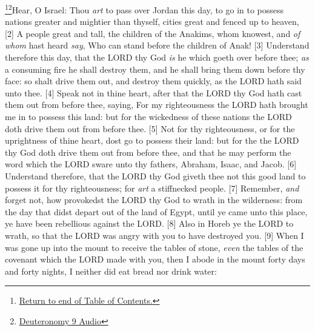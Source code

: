 \footnote{\textcolor[cmyk]{0.99998,1,0,0}{\hyperlink{TOC}{Return to end of Table of Contents.}}}\footnote{\href{https://audiobible.com/bible/deuteronomy_9.html}{\textcolor[cmyk]{0.99998,1,0,0}{Deuteronomy 9 Audio}}}\textcolor[cmyk]{0.99998,1,0,0}{Hear, O Israel: Thou \emph{art} to pass over Jordan this day, to go in to possess nations greater and mightier than thyself, cities great and fenced up to heaven,}
[2] \textcolor[cmyk]{0.99998,1,0,0}{A people great and tall, the children of the Anakims, whom  knowest, and \emph{of} \emph{whom}  hast heard \emph{say}, Who can stand before the children of Anak!}
[3] \textcolor[cmyk]{0.99998,1,0,0}{Understand therefore this day, that the LORD thy God \emph{is} he which goeth over before thee; \emph{as} a consuming fire he shall destroy them, and he shall bring them down before thy face: so shalt  drive them out, and destroy them quickly, as the LORD hath said unto thee.}
[4] \textcolor[cmyk]{0.99998,1,0,0}{Speak not  in thine heart, after that the LORD thy God hath cast them out from before thee, saying, For my righteousness the LORD hath brought me in to possess this land: but for the wickedness of these nations the LORD doth drive them out from before thee.}
[5] \textcolor[cmyk]{0.99998,1,0,0}{Not for thy righteousness, or for the uprightness of thine heart, dost  go to possess their land: but for the  the LORD thy God doth drive them out from before thee, and that he may perform the word which the LORD sware unto thy fathers, Abraham, Isaac, and Jacob.}
[6] \textcolor[cmyk]{0.99998,1,0,0}{Understand therefore, that the LORD thy God giveth thee not this good land to possess it for thy righteousness; for  \emph{art} a stiffnecked people.}
[7] \textcolor[cmyk]{0.99998,1,0,0}{Remember, \emph{and} forget not, how  provokedst the LORD thy God to wrath in the wilderness: from the day that  didst depart out of the land of Egypt, until ye came unto this place, ye have been rebellious against the LORD.}
[8] \textcolor[cmyk]{0.99998,1,0,0}{Also in Horeb ye  the LORD to wrath, so that the LORD was angry with you to have destroyed you.}
[9] \textcolor[cmyk]{0.99998,1,0,0}{When I was gone up into the mount to receive the tables of stone, \emph{even} the tables of the covenant which the LORD made with you, then I abode in the mount forty days and forty nights, I neither did eat bread nor drink water:}
